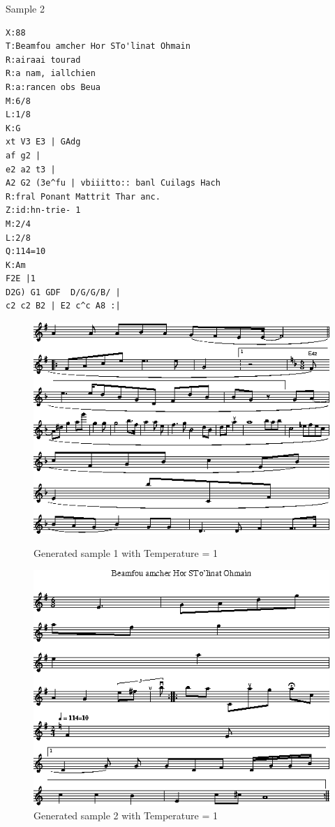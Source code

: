 \documentclass{article}
\begin{document}
Sample 2
\begin{lstlisting}
X:88
T:Beamfou amcher Hor STo'linat Ohmain
R:airaai tourad
R:a nam, iallchien
R:a:rancen obs Beua
M:6/8
L:1/8
K:G
xt V3 E3 | GAdg 
af g2 |
e2 a2 t3 |
A2 G2 (3e^fu | vbiiitto:: banl Cuilags Hach
R:fral Ponant Mattrit Thar anc.
Z:id:hn-trie- 1
M:2/4
L:2/8
Q:114=10
K:Am
F2E |1
D2G) G1 GDF  D/G/G/B/ | 
c2 c2 B2 | E2 c^c A8 :|
\end{lstlisting}

\begin{figure}[h]
\begin{minipage}{0.48\textwidth}
\centering
\includegraphics[width=\textwidth]{pics/generated_music_t1_1.png}
\caption{Generated sample 1 with Temperature = 1}
\end{minipage}\hfill
\begin{minipage}{0.48\textwidth}
\centering
\includegraphics[width=\textwidth]{pics/generated_music_t1_2.png}
\caption{Generated sample 2 with Temperature = 1}
\end{minipage}
\end{figure}
\newpage
\end{document}
